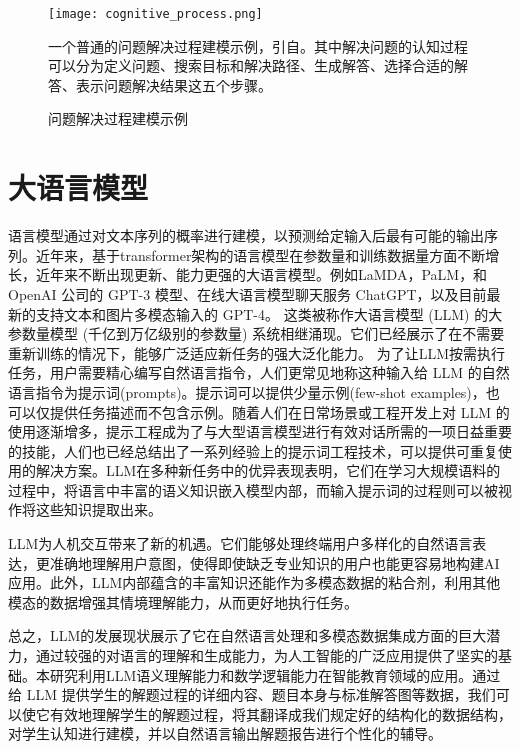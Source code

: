 \begin{figure}
    \centering
    \texttt{[image: cognitive\_process.png]}
    \caption*{一个普通的问题解决过程建模示例，引自\citet{wang2010cognitive}。其中解决问题的认知过程可以分为定义问题、搜索目标和解决路径、生成解答、选择合适的解答、表示问题解决结果这五个步骤。}
    \caption{问题解决过程建模示例}
    \label{fig:cognitive_process}
\end{figure}

\section{大语言模型}

语言模型通过对文本序列的概率进行建模，以预测给定输入后最有可能的输出序列。近年来，基于transformer架构\cite{vaswani2017attention}的语言模型在参数量和训练数据量方面不断增长，近年来不断出现更新、能力更强的大语言模型。例如LaMDA\cite{thoppilan2022lamda}，PaLM\cite{anil2023palm}，和 OpenAI 公司的 GPT-3 模型\cite{brown2020language}、在线大语言模型聊天服务 ChatGPT\cite{abdullah2022chatgpt}，以及目前最新的支持文本和图片多模态输入的 GPT-4\cite{achiam2023gpt}。 这类被称作大语言模型 (LLM) 的大参数量模型 (千亿到万亿级别的参数量) 系统相继涌现。它们已经展示了在不需要重新训练的情况下，能够广泛适应新任务的强大泛化能力。
为了让LLM按需执行任务，用户需要精心编写自然语言指令，人们更常见地称这种输入给 LLM 的自然语言指令为提示词(prompts)。提示词可以提供少量示例(few-shot examples)，也可以仅提供任务描述而不包含示例。随着人们在日常场景或工程开发上对 LLM 的使用逐渐增多，提示工程成为了与大型语言模型进行有效对话所需的一项日益重要的技能，人们也已经总结出了一系列经验上的提示词工程技术，可以提供可重复使用的解决方案\cite{white2023prompt}。LLM在多种新任务中的优异表现表明，它们在学习大规模语料的过程中，将语言中丰富的语义知识嵌入模型内部，而输入提示词的过程则可以被视作将这些知识提取出来。

LLM为人机交互带来了新的机遇\cite{bommasani2021opportunities}。它们能够处理终端用户多样化的自然语言表达，更准确地理解用户意图，使得即使缺乏专业知识的用户也能更容易地构建AI应用。此外，LLM内部蕴含的丰富知识还能作为多模态数据的粘合剂，利用其他模态的数据增强其情境理解能力，从而更好地执行任务。

总之，LLM的发展现状展示了它在自然语言处理和多模态数据集成方面的巨大潜力，通过较强的对语言的理解和生成能力，为人工智能的广泛应用提供了坚实的基础。本研究利用LLM语义理解能力和数学逻辑能力在智能教育领域的应用。通过给 LLM 提供学生的解题过程的详细内容、题目本身与标准解答图等数据，我们可以使它有效地理解学生的解题过程，将其翻译成我们规定好的结构化的数据结构，对学生认知进行建模，并以自然语言输出解题报告进行个性化的辅导。

